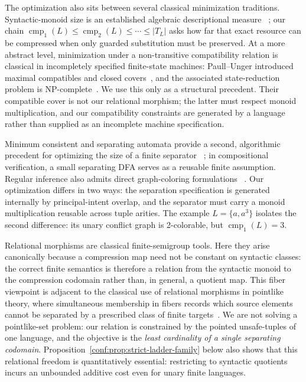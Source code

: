 \documentclass[10pt,a4paper]{article}
\theoremstyle{definition}
\theoremstyle{remark}
\newcommand{\cmp}{\operatorname{cmp}}
\begin{document}
The optimization also sits between several classical minimization traditions.
Syntactic-monoid size is an established algebraic descriptional measure%
~\cite{HolzerKonig2004}; our chain
$\cmp_1(L)\le\cmp_2(L)\le\cdots\le |T_L|$ asks how far that exact resource
can be compressed when only guarded substitution must be preserved.  At a
more abstract level, minimization under a non-transitive compatibility relation
is classical in incompletely specified finite-state machines: Paull--Unger
introduced maximal compatibles and closed covers~\cite{PaullUnger1959}, and
the associated state-reduction problem is NP-complete~\cite{Pfleeger1973}.
We use this only as a structural precedent.  Their compatible cover is not our
relational morphism; the latter must respect monoid multiplication, and our
compatibility constraints are generated by a language rather than supplied as
an incomplete machine specification.

Minimum consistent and separating automata provide a second, algorithmic
precedent for optimizing the size of a finite separator%
~\cite{PittWarmuth1993,ChenFarzanClarkeTsayWang2009,
VazquezPargaGarciaLopez2016,LaumenSnelVaandrager2026}; in compositional
verification, a small separating DFA serves as a reusable finite assumption.
Regular inference also admits direct graph-coloring formulations%
~\cite{CostaFlorencioVerwer2014}.  Our optimization differs in two ways: the
separation specification is generated internally by principal-intent overlap,
and the separator must carry a monoid multiplication reusable across tuple
arities.  The example $L=\{a,a^3\}$ isolates the second difference: its unary
conflict graph is 2-colorable, but $\cmp_1(L)=3$.

Relational morphisms are classical finite-semigroup tools.  Here they arise
canonically because a compression map need not be constant on syntactic
classes: the correct finite semantics is therefore a relation from the
syntactic monoid to the compression codomain rather than, in general, a
quotient map.  This fiber viewpoint is adjacent to the classical use of
relational morphisms in pointlike theory, where simultaneous membership in
fibers records which source elements cannot be separated by a prescribed class
of finite targets~\cite{Almeida1994,RhodesSteinberg2009}.  We are not solving a
pointlike-set problem: our relation is constrained by the pointed unsafe-tuples
of one language, and the objective is the \emph{least cardinality of a single
separating codomain}.  Proposition~\ref{conf:prop:strict-ladder-family} below
also shows that this relational freedom is quantitatively essential: restricting
to syntactic quotients incurs an unbounded additive cost even for unary finite
languages.
\end{document}
